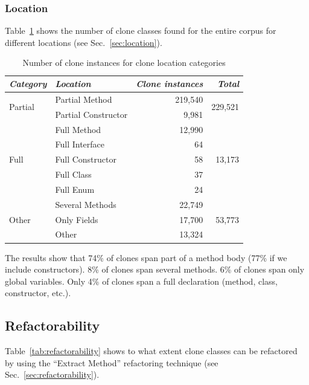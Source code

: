 \documentclass[sigconf,review,anonymous]{acmart}
\begin{document}
\subsubsection{Location}
Table~\ref{tab:location} shows the number of clone classes found for the entire corpus for different locations (see Sec.~\ref{sec:location}).

\begin{table}
\centering
\begin{tabular}{@{}llrr@{}}
\toprule
\textit{\textbf{Category}} & \textit{\textbf{Location}} & \textit{\textbf{Clone instances}} & \textit{\textbf{Total}} \\ \midrule
\multirow{2}{*}{Partial} & Partial Method & 219,540 & \multirow{2}{*}{229,521} \\ \cmidrule(lr){2-3}
 & Partial Constructor & 9,981 &  \\ \midrule
\multirow{5}{*}{Full} & Full Method & 12,990 & \multirow{5}{*}{13,173} \\ \cmidrule(lr){2-3}
 & Full Interface & 64 &  \\ \cmidrule(lr){2-3}
 & Full Constructor & 58 &  \\ \cmidrule(lr){2-3}
 & Full Class & 37 &  \\ \cmidrule(lr){2-3}
 & Full Enum & 24 &  \\ \midrule
\multirow{3}{*}{Other} & Several Methods & 22,749 & \multirow{3}{*}{53,773} \\ \cmidrule(lr){2-3}
 & Only Fields & 17,700 &  \\ \cmidrule(lr){2-3}
 & Other & 13,324 &  \\ \bottomrule
\end{tabular}
\caption{Number of clone instances for clone location categories}
\label{tab:location}
\end{table}

The results show that 74\% of clones span part of a method body (77\% if we include constructors). 8\% of clones span several methods. 6\% of clones span only global variables. Only 4\% of clones span a full declaration (method, class, constructor, etc.).

\subsection{Refactorability}
Table~\ref{tab:refactorability} shows to what extent clone classes can be refactored by using the ``Extract Method'' refactoring technique (see Sec.~\ref{sec:refactorability}).
\end{document}
